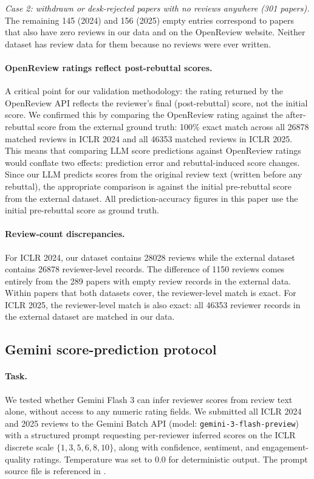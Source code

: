 \documentclass{article}
\newcommand{\code}[1]{\texttt{#1}}
\begin{document}
\textit{Case 2: withdrawn or desk-rejected papers with no reviews anywhere (301 papers).} The remaining 145 (2024) and 156 (2025) empty entries correspond to papers that also have zero reviews in our data and on the OpenReview website. Neither dataset has review data for them because no reviews were ever written.

\paragraph{OpenReview ratings reflect post-rebuttal scores.}
A critical point for our validation methodology: the rating returned by the OpenReview API reflects the reviewer's final (post-rebuttal) score, not the initial score. We confirmed this by comparing the OpenReview rating against the after-rebuttal score from the external ground truth: 100\% exact match across all \num{26878} matched reviews in ICLR 2024 and all \num{46353} matched reviews in ICLR 2025. This means that comparing LLM score predictions against OpenReview ratings would conflate two effects: prediction error and rebuttal-induced score changes. Since our LLM predicts scores from the original review text (written before any rebuttal), the appropriate comparison is against the initial pre-rebuttal score from the external dataset. All prediction-accuracy figures in this paper use the initial pre-rebuttal score as ground truth.

\paragraph{Review-count discrepancies.}
For ICLR 2024, our dataset contains \num{28028} reviews while the external dataset contains \num{26878} reviewer-level records. The difference of \num{1150} reviews comes entirely from the 289 papers with empty review records in the external data. Within papers that both datasets cover, the reviewer-level match is exact. For ICLR 2025, the reviewer-level match is also exact: all \num{46353} reviewer records in the external dataset are matched in our data.

\subsection{Gemini score-prediction protocol}\label{app:gemini-pred}

\paragraph{Task.}
We tested whether Gemini Flash 3 can infer reviewer scores from review text alone, without access to any numeric rating fields. We submitted all ICLR 2024 and 2025 reviews to the Gemini Batch API (model: \code{gemini-3-flash-preview}) with a structured prompt requesting per-reviewer inferred scores on the ICLR discrete scale $\{1, 3, 5, 6, 8, 10\}$, along with confidence, sentiment, and engagement-quality ratings. Temperature was set to 0.0 for deterministic output. The prompt source file is referenced in .
\end{document}
